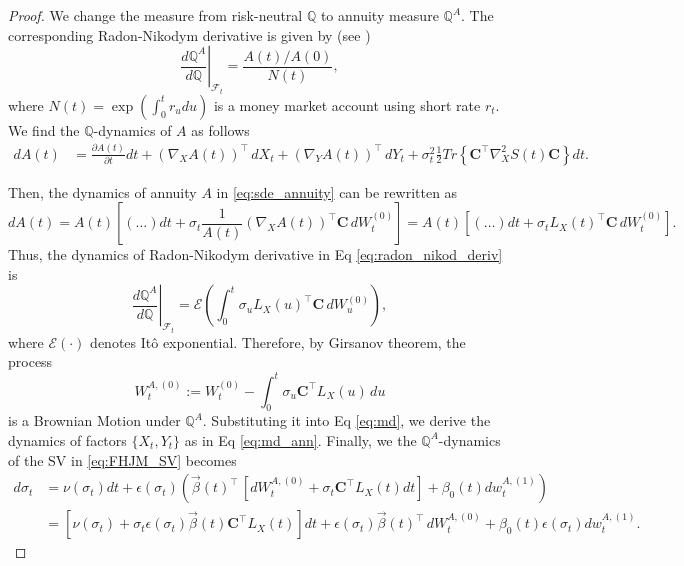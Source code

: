 \documentclass[pdftex,11pt,a4paper] {article}
\begin{document}
\begin{proof}
We change the measure from risk-neutral $\mathbb{Q}$ to annuity measure $\mathbb{Q}^A$.  The corresponding Radon-Nikodym derivative is given by (see \cite{Lucic2016})
\begin{equation}\label{eq:radon_nikod_deriv}
\left.\frac{d\mathbb{Q}^A}{d\mathbb{Q}}\right|_{\mathcal{F}_t}=\frac{A(t)/A(0)}{N(t)},
\end{equation}
where $N(t)=\exp\left(\int_0^t r_{u}du\right)$ is a money market account using short rate $r_{t}$. We find the $\mathbb{Q}$-dynamics of $A$ as follows
\begin{equation}\label{eq:sde_annuity}
\begin{split}
dA(t)&=\frac{\partial A(t)}{\partial t}dt + \left(\nabla_X A(t)\right)^\top\,dX_t+\left(\nabla_Y A(t)\right)^\top\,dY_t+\sigma_t^2\frac{1}{2}Tr\left\{\mathbf{C}^\top\nabla_X^2 S(t) \mathbf{C}\right\}dt.
\end{split}
\end{equation} 


Then, the dynamics of annuity $A$ in \eqref{eq:sde_annuity} can be rewritten as
\begin{equation*}%
dA(t)=A(t)\left[(\ldots)dt + \sigma_t\frac{1}{A(t)}\left(\nabla_X A(t)\right)^\top\mathbf{C}\, dW^{(0)}_t\right]=
A(t)\left[(\ldots)dt + \sigma_t L_X(t)^\top\mathbf{C}\, dW^{(0)}_t\right].
\end{equation*} 
Thus, the dynamics of Radon-Nikodym derivative in Eq \eqref{eq:radon_nikod_deriv} is 
\begin{equation*}
\left.\frac{d\mathbb{Q}^A}{d\mathbb{Q}}\right|_{\mathcal{F}_t}=\mathcal{E}\left(\int_0^t \sigma_u L_X(u)^\top\mathbf{C}\, dW^{(0)}_u\right),
\end{equation*}
where $\mathcal{E}(\cdot)$ denotes It\^{o} exponential.
Therefore, by Girsanov theorem, the process 
\begin{equation*}
W^{A,(0)}_t:=W^{(0)}_t-\int_0^t\sigma_u\mathbf{C}^\top L_X(u)\, du
\end{equation*}
is a Brownian Motion under $\mathbb{Q}^A$. Substituting it into Eq \eqref{eq:md}, we derive the dynamics of factors $\{X_t, Y_t\}$ as in Eq \eqref{eq:md_ann}. Finally, we the $\mathbb{Q}^A$-dynamics of the SV in \eqref{eq:FHJM_SV} becomes
\begin{equation*}
\begin{split}
d\sigma_t&=\nu(\sigma_t)dt+\epsilon(\sigma_t)\left(\vec{\beta}(t)^\top\,\left[dW^{A,(0)}_t+\sigma_t\mathbf{C}^\top L_X(t)dt\right] + \beta_{0}(t)dw^{A,(1)}_t\right)\\
&=\left[\nu(\sigma_t)+\sigma_t\epsilon(\sigma_t)\vec\beta(t)\mathbf{C}^\top L_X(t)\right]dt+\epsilon(\sigma_t)\vec{\beta}(t)^\top\,dW^{A,(0)}_t + \beta_{0}(t)\epsilon(\sigma_t)dw^{A,(1)}_t.
\end{split}
\end{equation*}
\end{proof}
\end{document}
